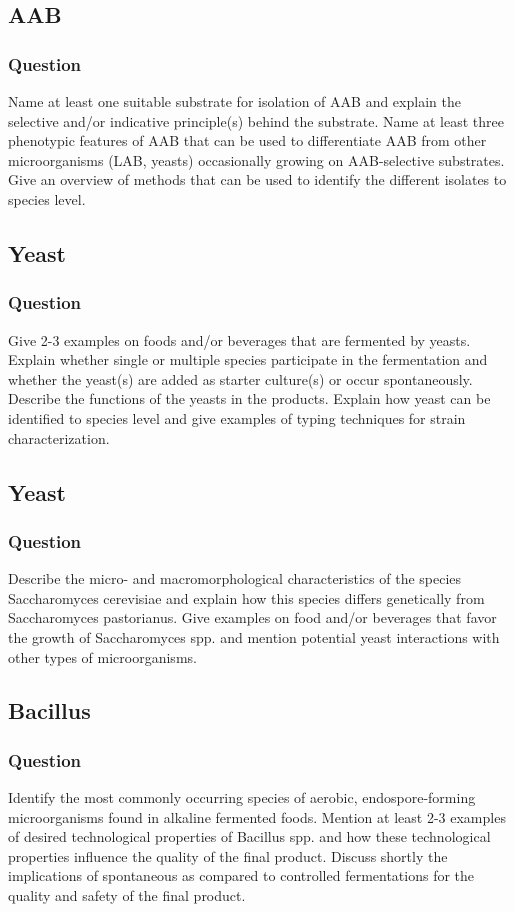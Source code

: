 \subsection{AAB}
\subsubsection*{Question}
Name at least one suitable substrate for isolation of AAB and explain the selective and/or indicative principle(s) behind the substrate. Name at least three phenotypic features of AAB that can be used to differentiate AAB from other microorganisms (LAB, yeasts) occasionally growing on AAB-selective substrates. Give an overview of methods that can be used to identify the different isolates to species level. 

\subsection{Yeast}
\subsubsection*{Question}
Give 2-3 examples on foods and/or beverages that are fermented by yeasts. Explain whether single or multiple species participate in the fermentation and whether the yeast(s) are added as starter culture(s) or occur spontaneously. Describe the functions of the yeasts in the products. Explain how yeast can be identified to species level and give examples of typing techniques for strain characterization. 

\subsection{Yeast}
\subsubsection*{Question}
Describe the micro- and macromorphological characteristics of the species Saccharomyces cerevisiae and explain how this species differs genetically from Saccharomyces pastorianus. Give examples on food and/or beverages that favor the growth of Saccharomyces spp. and mention potential yeast interactions with other types of microorganisms. 

\subsection{Bacillus}
\subsubsection*{Question}
Identify the most commonly occurring species of aerobic, endospore-forming microorganisms found in alkaline fermented foods. Mention at least 2-3 examples of desired technological properties of Bacillus spp. and how these technological properties influence the quality of the final product. Discuss shortly the implications of spontaneous as compared to controlled fermentations for the quality and safety of the final product.  

